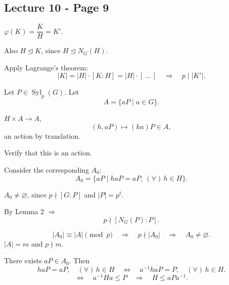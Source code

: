 
\subsection*{Lecture 10 - Page 9}

\noindent $\varphi(K)=\dfrac{K}{H}=K'.$

\medskip
\noindent Also $H\trianglelefteq K$, since $H\trianglelefteq N_G(H)$.

\medskip
\noindent Apply Lagrange's theorem:
\[
|K|=|H|\cdot[K:H]=|H|\cdot[\,\ldots\,]
\quad\Longrightarrow\quad p\mid|K'|.
\]

\bigskip
\noindent{}

\medskip
\noindent Let $P\in\operatorname{Syl}_p(G)$. Let
\[
A=\{aP\mid a\in G\}.
\]

\noindent $H\times A\longrightarrow A$,
\[
(h,aP)\longmapsto(ha)P\in A,
\]
\noindent an action by translation.

\noindent Verify that this is an action.

\medskip
\noindent Consider the corresponding $A_0$:
\[
A_0=\{aP\mid haP=aP,\ (\forall)\,h\in H\}.
\]

\noindent $A_0\neq\varnothing$, since $p\nmid[G:P]$ and
$|P|=p^t$.

\medskip
\noindent By Lemma 2 $\Longrightarrow$
\[
p\nmid[N_G(P):P].
\]

\medskip
\noindent
\[
|A_0|\equiv|A|\pmod p
\quad\Longrightarrow\quad p\nmid|A_0|
\quad\Longrightarrow\quad A_0\neq\varnothing.
\]
\noindent $|A|=m$ and $p\nmid m$.

\medskip
\noindent There exists $aP\in A_0$. Then
\[
haP=aP,\quad(\forall)\,h\in H
\quad\Longleftrightarrow\quad
 a^{-1}haP=P,\quad(\forall)\,h\in H.
\]
\[
\Longleftrightarrow\quad a^{-1}Ha\leq P
\quad\Longrightarrow\quad H\leq aPa^{-1}.
\]

